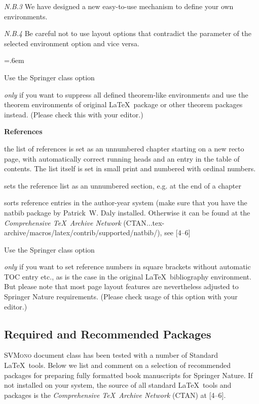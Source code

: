 \documentclass[graybox,square]{svmono}
\begin{document}
\begin{sloppy}
\textit{N.B.3} We have designed a new easy-to-use mechanism to define your own environments.


\textit{N.B.4} Be careful not to use layout options that contradict the parameter of the
selected environment option and vice versa. 


\parskip=.6em

Use the Springer class option

\begin{description}
\item[\textit{nospthms}] \textit{only} if you want to suppress all defined theorem-like
environments and use the theorem environments of original \LaTeX\ package or other theorem packages instead. (Please check this with your editor.)
\end{description}


\textbf{References}

\begin{description}
\item[\textit{default}] the list of references is set as an unnumbered chapter starting on a new recto page, with automatically correct running heads and an entry in the table of contents. The
list itself is set in small print and numbered with ordinal numbers.
\item[\textit{sectrefs}] sets the reference list as an unnumbered section, e.g. at the end of a chapter
\item[\textit{natbib}] sorts reference entries in the author-year system
(make sure that you have the natbib package by
Patrick~W. Daly installed. Otherwise it can be found at
the \textit{Comprehensive \TeX\ Archive Network} (CTAN...tex-\break archive/macros/latex/contrib/supported/natbib/), see [4--6]
\end{description}

Use the Springer class option
\begin{description}
\item[\textit{oribibl}] {\it only} if you want to set reference numbers in square brackets without automatic TOC entry etc., as is the case in the original \LaTeX\ bibliography environment. But please note that most page layout features are nevertheless adjusted to Springer Nature requirements. (Please check usage of this option with your editor.)
\end{description}

\subsection{Required and Recommended Packages}\label{subsec:3}
\textsc{SVMono} document class has been tested with a number of Standard \LaTeX\
tools. Below we list and comment on a selection of recommended packages for
preparing fully formatted book manuscripts for Springer Nature. If not installed
on your system, the source of all standard \LaTeX\ tools and packages is the
\textit{Comprehensive \TeX\ Archive Network} (CTAN) at [4--6].



\end{sloppy}
\end{document}
